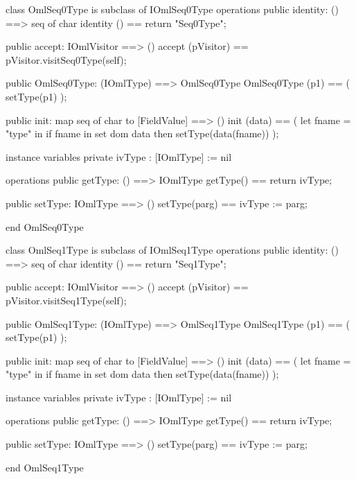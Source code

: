 \begin{vdm_al}
class OmlSeq0Type is subclass of IOmlSeq0Type
operations
  public identity: () ==> seq of char
  identity () == return "Seq0Type";

  public accept: IOmlVisitor ==> ()
  accept (pVisitor) == pVisitor.visitSeq0Type(self);

  public OmlSeq0Type:
      (IOmlType) ==> OmlSeq0Type
  OmlSeq0Type (p1) == 
   ( setType(p1) );

  public init: map seq of char to [FieldValue] ==> ()
  init (data) ==
    ( let fname = "type" in
        if fname in set dom data
        then setType(data(fname)) );

instance variables
  private ivType : [IOmlType] := nil

operations
  public getType: () ==> IOmlType
  getType() == return ivType;

  public setType: IOmlType ==> ()
  setType(parg) == ivType := parg;

end OmlSeq0Type
\end{vdm_al}

\begin{vdm_al}
class OmlSeq1Type is subclass of IOmlSeq1Type
operations
  public identity: () ==> seq of char
  identity () == return "Seq1Type";

  public accept: IOmlVisitor ==> ()
  accept (pVisitor) == pVisitor.visitSeq1Type(self);

  public OmlSeq1Type:
      (IOmlType) ==> OmlSeq1Type
  OmlSeq1Type (p1) == 
   ( setType(p1) );

  public init: map seq of char to [FieldValue] ==> ()
  init (data) ==
    ( let fname = "type" in
        if fname in set dom data
        then setType(data(fname)) );

instance variables
  private ivType : [IOmlType] := nil

operations
  public getType: () ==> IOmlType
  getType() == return ivType;

  public setType: IOmlType ==> ()
  setType(parg) == ivType := parg;

end OmlSeq1Type
\end{vdm_al}

